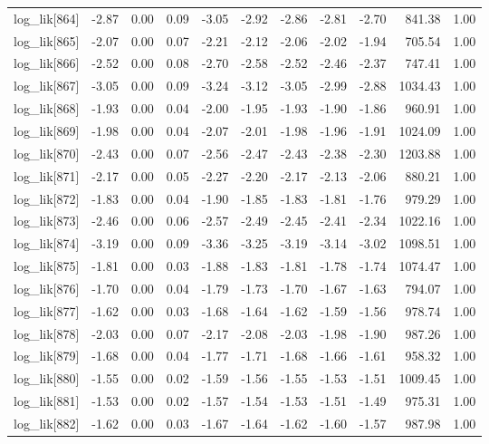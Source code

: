 \begin{table}[ht]
\begin{tabular}{rrrrrrrrrrr}
  log\_lik[864] & -2.87 & 0.00 & 0.09 & -3.05 & -2.92 & -2.86 & -2.81 & -2.70 & 841.38 & 1.00 \\ 
  log\_lik[865] & -2.07 & 0.00 & 0.07 & -2.21 & -2.12 & -2.06 & -2.02 & -1.94 & 705.54 & 1.00 \\ 
  log\_lik[866] & -2.52 & 0.00 & 0.08 & -2.70 & -2.58 & -2.52 & -2.46 & -2.37 & 747.41 & 1.00 \\ 
  log\_lik[867] & -3.05 & 0.00 & 0.09 & -3.24 & -3.12 & -3.05 & -2.99 & -2.88 & 1034.43 & 1.00 \\ 
  log\_lik[868] & -1.93 & 0.00 & 0.04 & -2.00 & -1.95 & -1.93 & -1.90 & -1.86 & 960.91 & 1.00 \\ 
  log\_lik[869] & -1.98 & 0.00 & 0.04 & -2.07 & -2.01 & -1.98 & -1.96 & -1.91 & 1024.09 & 1.00 \\ 
  log\_lik[870] & -2.43 & 0.00 & 0.07 & -2.56 & -2.47 & -2.43 & -2.38 & -2.30 & 1203.88 & 1.00 \\ 
  log\_lik[871] & -2.17 & 0.00 & 0.05 & -2.27 & -2.20 & -2.17 & -2.13 & -2.06 & 880.21 & 1.00 \\ 
  log\_lik[872] & -1.83 & 0.00 & 0.04 & -1.90 & -1.85 & -1.83 & -1.81 & -1.76 & 979.29 & 1.00 \\ 
  log\_lik[873] & -2.46 & 0.00 & 0.06 & -2.57 & -2.49 & -2.45 & -2.41 & -2.34 & 1022.16 & 1.00 \\ 
  log\_lik[874] & -3.19 & 0.00 & 0.09 & -3.36 & -3.25 & -3.19 & -3.14 & -3.02 & 1098.51 & 1.00 \\ 
  log\_lik[875] & -1.81 & 0.00 & 0.03 & -1.88 & -1.83 & -1.81 & -1.78 & -1.74 & 1074.47 & 1.00 \\ 
  log\_lik[876] & -1.70 & 0.00 & 0.04 & -1.79 & -1.73 & -1.70 & -1.67 & -1.63 & 794.07 & 1.00 \\ 
  log\_lik[877] & -1.62 & 0.00 & 0.03 & -1.68 & -1.64 & -1.62 & -1.59 & -1.56 & 978.74 & 1.00 \\ 
  log\_lik[878] & -2.03 & 0.00 & 0.07 & -2.17 & -2.08 & -2.03 & -1.98 & -1.90 & 987.26 & 1.00 \\ 
  log\_lik[879] & -1.68 & 0.00 & 0.04 & -1.77 & -1.71 & -1.68 & -1.66 & -1.61 & 958.32 & 1.00 \\ 
  log\_lik[880] & -1.55 & 0.00 & 0.02 & -1.59 & -1.56 & -1.55 & -1.53 & -1.51 & 1009.45 & 1.00 \\ 
  log\_lik[881] & -1.53 & 0.00 & 0.02 & -1.57 & -1.54 & -1.53 & -1.51 & -1.49 & 975.31 & 1.00 \\ 
  log\_lik[882] & -1.62 & 0.00 & 0.03 & -1.67 & -1.64 & -1.62 & -1.60 & -1.57 & 987.98 & 1.00 \\ 

\end{tabular}
\end{table}
